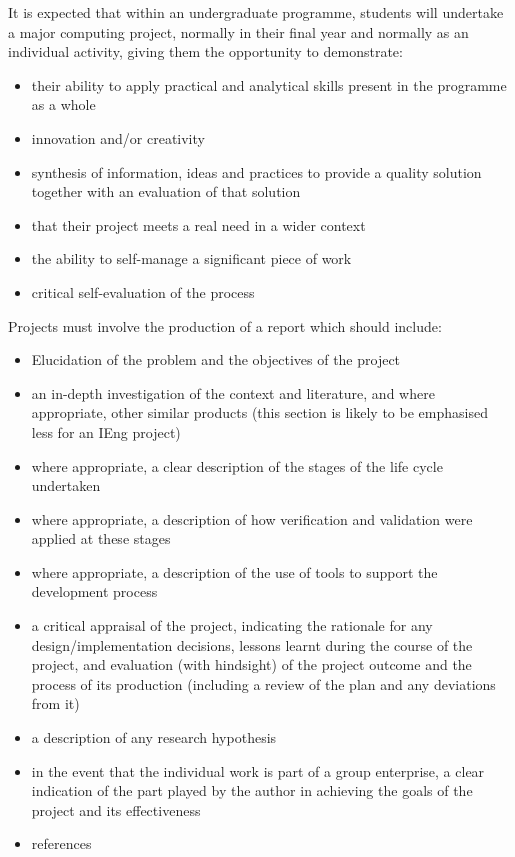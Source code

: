 \documentclass{../fal_assignment}
\begin{document}
It is expected that within an undergraduate programme, students will undertake a major computing project, normally in
their final year and normally as an individual activity, giving them the opportunity to demonstrate:

\begin{itemize}
\item their ability to apply practical and analytical skills present in the programme as a whole
\item innovation and/or creativity
\item synthesis of information, ideas and practices to provide a quality solution together with an evaluation of that solution
\item that their project meets a real need in a wider context
\item the ability to self-manage a significant piece of work
\item critical self-evaluation of the process
\end{itemize}

Projects must involve the production of a report which should include:

\begin{itemize}
\item Elucidation of the problem and the objectives of the project
\item an in-depth investigation of the context and literature, and where appropriate, other similar products (this section is
likely to be emphasised less for an IEng project)
\item where appropriate, a clear description of the stages of the life cycle undertaken
\item where appropriate, a description of how verification and validation were applied at these stages
\item where appropriate, a description of the use of tools to support the development process
\item a critical appraisal of the project, indicating the rationale for any design/implementation decisions, lessons learnt
during the course of the project, and evaluation (with hindsight) of the project outcome and the process of its
production (including a review of the plan and any deviations from it)
\item a description of any research hypothesis
\item in the event that the individual work is part of a group enterprise, a clear indication of the part played by the author in
achieving the goals of the project and its effectiveness
\item references 
\end{itemize}
\end{document}
